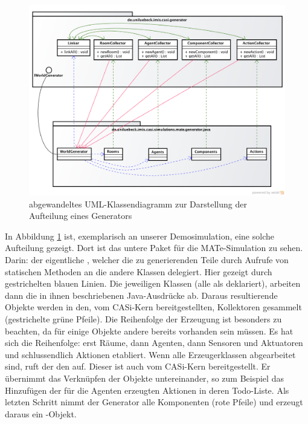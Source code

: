 \begin{figure}[htb]
  \begin{center}
    \includegraphics[width=\textwidth]{pics/howToGenerateAWorld.png}
  \end{center}
  \caption{abgewandeltes UML-Klassendiagramm zur Darstellung der Aufteilung eines Generators}
  \label{fig:howToGenerateAWorld}
\end{figure}
In Abbildung \ref{fig:howToGenerateAWorld} ist, exemplarisch an unserer Demosimulation, eine solche Aufteilung gezeigt.
Dort ist das untere Paket für die MATe-Simulation zu sehen. Darin: der eigentliche , welcher die zu generierenden Teile durch Aufrufe von statischen Methoden an die andere Klassen delegiert. Hier gezeigt durch gestrichelten blauen Linien.
Die jeweiligen Klassen (alle als  deklariert), arbeiten dann die in ihnen beschriebenen Java-Ausdrücke ab.
Daraus resultierende Objekte werden in den, vom CASi-Kern bereitgestellten, Kollektoren gesammelt (gestrichelte grüne Pfeile). Die Reihenfolge der Erzeugung ist besonders zu beachten, da für einige Objekte andere bereits vorhanden sein müssen. Es hat sich die Reihenfolge: erst Räume, dann Agenten, dann Sensoren und Aktuatoren und schlussendlich Aktionen etabliert.
Wenn alle Erzeugerklassen abgearbeitet sind, ruft der  den  auf. Dieser ist auch vom CASi-Kern bereitgestellt. Er übernimmt das Verknüpfen der Objekte untereinander, so zum Beispiel das Hinzufügen der für die Agenten erzeugten Aktionen in deren Todo-Liste.
Als letzten Schritt nimmt der Generator alle Komponenten (rote Pfeile) und erzeugt daraus ein -Objekt.


